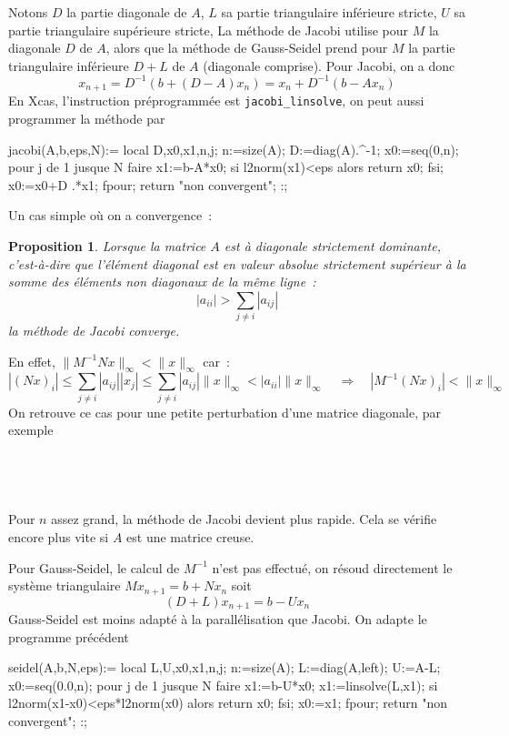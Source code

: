 \documentclass[a4paper,11pt]{book}
\newtheorem{prop}[thm]{Proposition}
\begin{document}
\begin{giacjshere}
Notons $D$ la partie diagonale de $A$,
$L$ sa partie triangulaire inf\'erieure stricte, $U$ sa partie
triangulaire sup\'erieure stricte,
La m\'ethode de Jacobi utilise pour $M$ la
diagonale $D$ de $A$, alors
que la m\'ethode de Gauss-Seidel prend pour $M$ la partie triangulaire
inf\'erieure $D+L$ de $A$ (diagonale comprise). 
Pour Jacobi, on a donc
$$ x_{n+1}=D^{-1}(b+(D-A)x_n)=x_n+D^{-1}(b-Ax_n)$$
En Xcas, l'instruction pr\'eprogramm\'ee est \verb|jacobi_linsolve|, 
on peut aussi programmer la m\'ethode par
\begin{giacprog}
jacobi(A,b,eps,N):={
  local D,x0,x1,n,j;
  n:=size(A);
  D:=diag(A).^-1;
  x0:=seq(0,n);
  pour j de 1 jusque N faire
    x1:=b-A*x0;
    si l2norm(x1)<eps alors return x0; fsi;
    x0:=x0+D .*x1;
  fpour;
  return "non convergent";
}:;
\end{giacprog}
Un cas simple o\`u on a convergence~:
\begin{prop} 
Lorsque la matrice $A$ est
\`a diagonale strictement dominante, c'est-\`a-dire que
l'\'el\'ement diagonal est en valeur absolue strictement sup\'erieur
\`a la somme des \'el\'ements non diagonaux de la m\^eme ligne~:
$$ |a_{ii}| > \sum_{j\neq i} |a_{ij}| $$
la m\'ethode de Jacobi converge.
\end{prop}
En effet,
$\|M^{-1}Nx\|_\infty < \| x\|_\infty$ car~:
$$ |(Nx)_i| \leq \sum_{j \neq i} |a_{ij}| |x_j| \leq \sum_{j \neq i}
|a_{ij}| \|x\|_\infty < |a_{ii}| \| x\|_\infty  
\quad  \Rightarrow \quad |M^{-1}(Nx)_i| <  \| x\|_\infty $$
On retrouve ce cas pour une petite perturbation d'une matrice
diagonale, par exemple~\\
\\
\\
\\
\\
Pour $n$ assez grand, la m\'ethode de Jacobi devient plus rapide. Cela
se v\'erifie encore plus vite si $A$ est une matrice creuse.

Pour Gauss-Seidel,
le calcul de $M^{-1}$ n'est pas effectu\'e, on r\'esoud
directement le syst\`eme triangulaire $Mx_{n+1}=b+Nx_n$ soit
$$ (D+L)x_{n+1}=b-Ux_n$$ 
Gauss-Seidel
est moins adapt\'e \`a la parall\'elisation que Jacobi.
On adapte le programme pr\'ec\'edent
\begin{giacprog}
seidel(A,b,N,eps):={
  local L,U,x0,x1,n,j;
  n:=size(A);
  L:=diag(A,left);
  U:=A-L;
  x0:=seq(0.0,n);
  pour j de 1 jusque N faire
    x1:=b-U*x0;
    x1:=linsolve(L,x1);
    si l2norm(x1-x0)<eps*l2norm(x0) alors return x0; fsi;
    x0:=x1;
  fpour;
  return "non convergent";
}:;
\end{giacprog}


\end{giacjshere}
\end{document}
